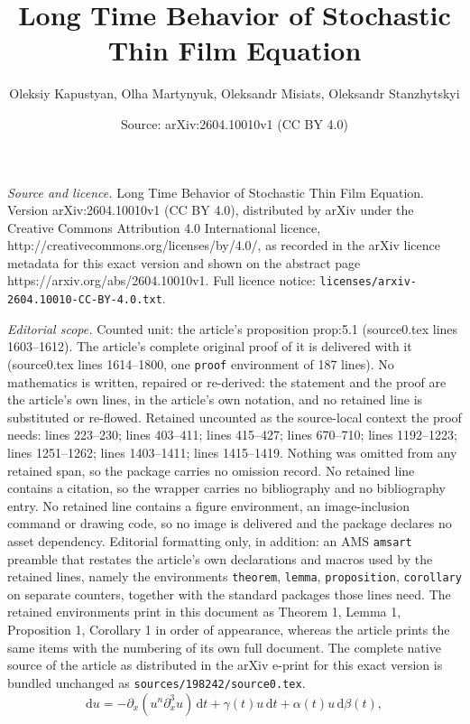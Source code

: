 \documentclass[10pt,a4paper]{amsart}
\title{Long Time Behavior of Stochastic Thin Film Equation}
\author{Oleksiy Kapustyan, Olha Martynyuk, Oleksandr Misiats, Oleksandr Stanzhytskyi}
\date{Source: arXiv:2604.10010v1 (CC BY 4.0)}
\begin{document}
\maketitle

\noindent\emph{Source and licence.} Long Time Behavior of Stochastic Thin Film Equation. Version arXiv:2604.10010v1 (CC BY 4.0), distributed by arXiv under the Creative Commons Attribution 4.0 International licence, http://creativecommons.org/licenses/by/4.0/, as recorded in the arXiv licence metadata for this exact version and shown on the abstract page https://arxiv.org/abs/2604.10010v1. Full licence notice: \texttt{licenses/arxiv-2604.10010-CC-BY-4.0.txt}.\par\smallskip

\noindent\textit{Editorial scope.} Counted unit: the article's proposition prop:5.1 (source0.tex lines 1603--1612). The article's complete original proof of it is delivered with it (source0.tex lines 1614--1800, one \texttt{proof} environment of 187 lines). No mathematics is written, repaired or re-derived: the statement and the proof are the article's own lines, in the article's own notation, and no retained line is substituted or re-flowed.  Retained uncounted as the source-local context the proof needs: lines 223--230; lines 403--411; lines 415--427; lines 670--710; lines 1192--1223; lines 1251--1262; lines 1403--1411; lines 1415--1419.  Nothing was omitted from any retained span, so the package carries no omission record.  No retained line contains a citation, so the wrapper carries no bibliography and no bibliography entry.  No retained line contains a figure environment, an image-inclusion command or drawing code, so no image is delivered and the package declares no asset dependency.  Editorial formatting only, in addition: an AMS \texttt{amsart} preamble that restates the article's own declarations and macros used by the retained lines, namely the environments \texttt{theorem}, \texttt{lemma}, \texttt{proposition}, \texttt{corollary} on separate counters, together with the standard packages those lines need.  The retained environments print in this document as Theorem 1, Lemma 1, Proposition 1, Corollary 1 in order of appearance, whereas the article prints the same items with the numbering of its own full document.  The complete native source of the article as distributed in the arXiv e-print for this exact version is bundled unchanged as \texttt{sources/198242/source0.tex}.
\begin{equation}
\mathrm{d}u
=
- \partial_x\!\left(u^n \partial_x^3 u\right)\,\mathrm{d}t
+ \gamma(t) u \,\mathrm{d}t
+ \alpha(t) u \,\mathrm{d} \beta (t),
\label{1.1}
\end{equation}
\end{document}
